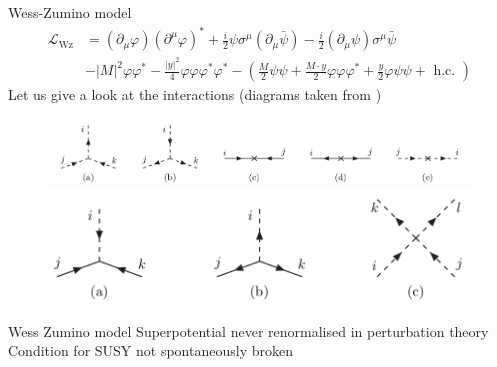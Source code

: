 \documentclass[10pt]{beamer}
\begin{document}
\begin{frame}{Wess-Zumino model}
    \begin{equation*}
        \begin{aligned}
            \mathcal{L}_{\mathrm{Wz}} &=\left(\partial_{\mu} \varphi\right)\left(\partial^{\mu} \varphi\right)^{*}+\frac{i}{2} \psi \sigma^{\mu}\left(\partial_{\mu} \bar{\psi}\right)-\frac{i}{2}\left(\partial_{\mu} \psi\right) \sigma^{\mu} \bar{\psi} \\
            &-|M|^{2} \varphi \varphi^{*}-\frac{|y|^{2}}{4} \varphi \varphi \varphi^{*} \varphi^{*}-\left(\frac{M}{2} \psi \psi+\frac{M \cdot y}{2} \varphi \varphi \varphi^{*}+\frac{y}{2} \varphi \psi \psi+\text { h.c. }\right)
            \end{aligned}
    \end{equation*}
    Let us give a look at the interactions (diagrams taken from \cite{MARTIN_1998})
        \begin{figure}
            \centering
            \includegraphics[scale=0.22]{feynman1.png}
            \includegraphics[scale=0.22]{feynman2.png}
        \end{figure}
\end{frame}

\begin{frame}{Wess Zumino model}
    Superpotential never renormalised in perturbation theory \cite{Grisaru:1979wc} \\
    Condition for SUSY not spontaneously broken
\end{frame}
    
\end{document}
